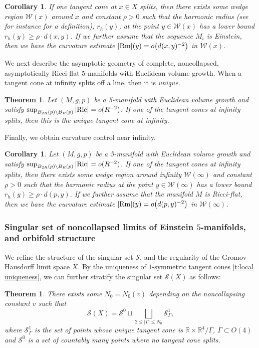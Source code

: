 \documentclass[11pt,reqno]{amsart}
\numberwithin{equation}{section}
\newcommand{\RR}{\mathds{R}}
\newcommand{\Rm}{{\rm Rm}}
\newcommand{\Ric}{{\rm Ric}}
\newcommand{\cS}{\mathcal{S}}
\newcommand{\cW}{\mathcal{W}}
\newtheorem{theorem}[thm]{Theorem}
\newtheorem{corollary}[thm]{Corollary}
\theoremstyle{definition}
\theoremstyle{remark}
\begin{document}
\begin{corollary}\label{c:local curvature est}
    If one tangent cone at $x \in X$ splits, then there exists some wedge region $\cW(x)$ around $x$ and constant $\rho>0$ such that the harmonic radius (see for instance \cite{and90} for a definition), $r_h(y)$, at the point $y \in \cW(x)$ has a lower bound $r_h(y) \ge \rho \cdot  d(x,y)$. If we further assume that the sequence $M_i$ is \emph{Einstein}, then we have the curvature estimate $|\Rm|(y) =o \big( d(x,y)^{-2} \big)$ in $\cW(x)$. 
\end{corollary}

We next describe the asymptotic geometry of complete, noncollapsed, asymptotically Ricci-flat $5$-manifolds with Euclidean volume growth.  
When a tangent cone at infinity splits off a line, then it is \emph{unique}.

\begin{theorem}\label{t:uniqueness at infinity}
    Let $(M,g,p)$ be a 5-manifold with  Euclidean volume growth and satisfy $\sup_{B_{2R}(p) \setminus B_R(p)}|\Ric| = o(R^{-2})$. If one of the tangent cones at infinity splits, then this is the \emph{unique} tangent cone at infinity.
\end{theorem}

Finally, we obtain curvature control near infinity.

\begin{corollary}\label{c:infinity est}
    Let $(M,g,p)$ be a 5-manifold with  Euclidean volume growth and satisfy $\sup_{B_{2R}(p) \setminus B_R(p)}|\Ric| = o(R^{-2})$. If one of the tangent cones at infinity splits, then there exists some wedge region around infinity $\cW(\infty)$ and constant $\rho >0$ such that the harmonic radius at the point $y \in \cW(\infty)$ has a lower bound $r_h(y) \ge \rho \cdot  d(p,y)$. If we further assume that the manifold $M$ is \emph{Ricci-flat}, then we have the curvature estimate $|\Rm|(y) = o\big( d(p,y)^{-2} \big)$ in $\cW(\infty)$. 
\end{corollary}



\subsubsection{Singular set of noncollapsed limits of Einstein $5$-manifolds, and orbifold structure} 


We refine the structure of the singular set $\cS$, and the regularity of the Gromov-Hausdorff limit space $X$. By the uniqueness of $1$-symmetric tangent cones \ref{t:local uniqueness}, we can further stratify the singular set $\cS(X)$ as follows: 
\begin{theorem}\label{t:new stratification}
    There exists some $N_0 = N_0(v)$ depending on the noncollapsing constant $v$ such that
\begin{equation}
    \cS(X) = \cS^0 \sqcup \bigsqcup_{2 \leqslant |\Gamma| \leqslant N_0} \cS^1_{\Gamma}, 
\end{equation}
where $\cS_{\Gamma}^1$ is the set of points whose unique tangent cone is $\RR \times \RR^4/\Gamma$, $\Gamma\subset O(4)$ and $\cS^0$ is a set of countably many points where no tangent cone splits. 
\end{theorem}
\end{document}
